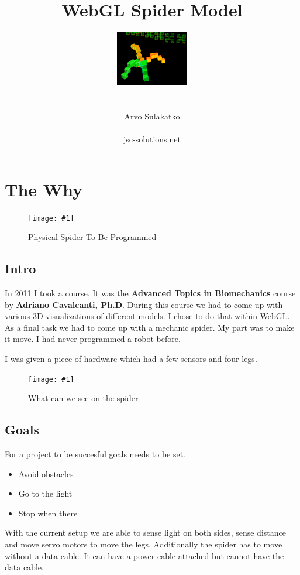 \documentclass[12pt,leqno]{book}
\title{WebGL Spider Model}
\author{\includegraphics{../Design/Preview.png} \\ \\ \\ Arvo Sulakatko \\ \\ \href{http://www.jsc-solutions.net}{jsc-solutions.net} }
\newcommand{\png}[1]{\texttt{[image: \#1]}}
\newcommand{\figpng}[2]{\begin{figure}[htb]\centering\png{#1}\caption{#2}\end{figure}}
\begin{document}
\maketitle



\tableofcontents
\listoffigures


\chapter{The Why}

\figpng{Images/www.youtube.comvhKksAVmekAE_-_Google_Chrome-2012-03-14_16.27.22}
{Physical Spider To Be Programmed}




\section{Intro}

In 2011 I took a course. It was the \textbf{Advanced Topics in Biomechanics} course by \textbf{Adriano Cavalcanti, Ph.D}. During this course we had to come up with various 3D visualizations of different models. I chose to do that within WebGL. As a final task we had to come up with a mechanic spider. My part was to make it move. I had never programmed a robot before. 

I was given a piece of hardware which had a few sensors and four legs.

\figpng{Images/parts}
{What can we see on the spider}




\section{Goals}

For a project to be succesful goals needs to be set.

\begin{itemize}
\item Avoid obstacles
\item Go to the light
\item Stop when there
\end{itemize}

With the current setup we are able to sense light on both sides, sense distance and move servo motors to move the legs. Additionally the spider has to move without a data cable. It can have a power cable attached but cannot have the data cable.
\end{document}
